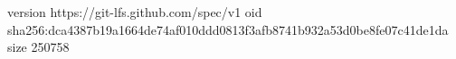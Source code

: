 version https://git-lfs.github.com/spec/v1
oid sha256:dca4387b19a1664de74af010ddd0813f3afb8741b932a53d0be8fe07c41de1da
size 250758
